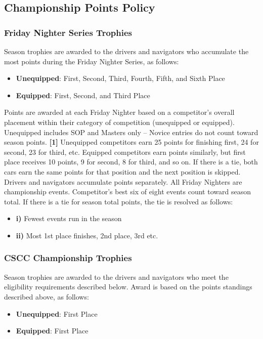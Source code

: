 \subsection{Championship Points Policy}
\subsubsection{Friday Nighter Series Trophies}
Season trophies are awarded to the drivers and navigators who accumulate the most points during the Friday Nighter Series, as follows:
\begin{itemize}
\item \textbf{Unequipped}: First, Second, Third, Fourth, Fifth, and Sixth Place
\item \textbf{Equipped}: First, Second, and Third Place
\end{itemize}

Points are awarded at each Friday Nighter based on a competitor’s overall placement within their category of competition (unequipped or equipped). Unequipped includes SOP and Masters only – Novice entries do not count toward season points. \textbf{[1]} Unequipped competitors earn 25 points for finishing first, 24 for second, 23 for third, etc. Equipped competitors earn points similarly, but first place receives 10 points, 9 for second, 8 for third, and so on. If there is a tie, both cars earn the same points for that position and the next position is skipped. Drivers and navigators accumulate points separately. All Friday Nighters are championship events. Competitor’s best six of eight events count toward season total. If there is a tie for season total points, the tie is resolved as follows:
\begin{itemize}
\item \textbf{i)} Fewest events run in the season
\item \textbf{ii)} Most 1st place finishes, 2nd place, 3rd etc.
\end{itemize}

\subsubsection{CSCC Championship Trophies}
Season trophies are awarded to the drivers and navigators who meet the eligibility requirements described below. Award is based on the points standings described above, as follows:
\begin{itemize}
\item \textbf{Unequipped}: First Place
\item \textbf{Equipped}: First Place
\end{itemize}

